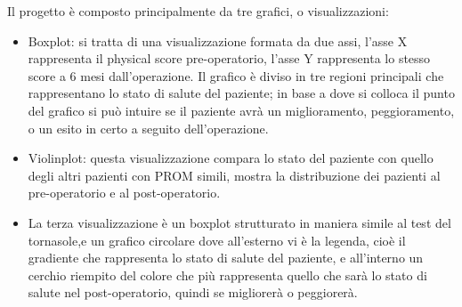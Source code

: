 Il progetto è composto principalmente da tre grafici, o visualizzazioni: 
\begin{itemize}
    \item Boxplot: si tratta di una visualizzazione formata da due assi, l'asse X rappresenta il physical score pre-operatorio, l'asse Y rappresenta lo stesso score a 6 mesi dall'operazione. Il grafico è diviso in tre regioni principali che rappresentano lo stato di salute del paziente; in base a dove si colloca il punto del grafico si può intuire se il paziente avrà un miglioramento, peggioramento, o un esito in certo a seguito dell'operazione. 
    \item Violinplot: questa visualizzazione compara lo stato del paziente con quello degli altri pazienti con PROM simili, mostra la distribuzione dei pazienti al pre-operatorio e al post-operatorio. 
    \item La terza visualizzazione è un boxplot strutturato in maniera simile al test del tornasole,e un grafico circolare dove all'esterno vi è la legenda, cioè il gradiente che rappresenta lo stato di salute del paziente, e all'interno un cerchio riempito del colore che più rappresenta quello che sarà lo stato di salute nel post-operatorio, quindi se migliorerà o peggiorerà. 
\end{itemize}

